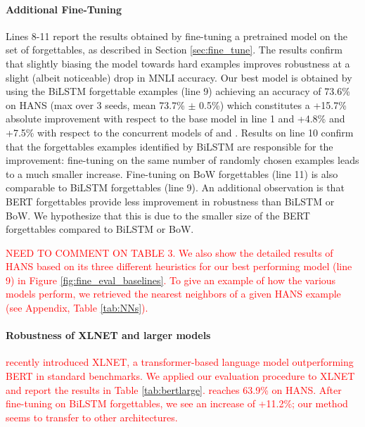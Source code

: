 \paragraph{Additional Fine-Tuning} Lines 8-11 report the results obtained by fine-tuning a pretrained model on the set of forgettables, as described in Section \ref{sec:fine_tune}. The results confirm that slightly biasing the model towards hard examples improves robustness at a slight (albeit noticeable) drop in MNLI accuracy. 
Our best model is obtained by using the BiLSTM forgettable examples (line 9) achieving an accuracy of 73.6\% on HANS (max over 3 seeds, mean 73.7\% $\pm$ 0.5\%)
which constitutes a +15.7\% absolute improvement with respect to the base model in line 1 and +4.8\% and +7.5\% with respect to the concurrent models of  and . 
Results on line 10 confirm that the forgettables examples identified by BiLSTM are responsible for the improvement: fine-tuning on the same number of randomly chosen examples leads to a much smaller increase. 
Fine-tuning on BoW forgettables (line 11) is also comparable to BiLSTM forgettables (line 9).
An additional observation is that BERT forgettables provide less improvement in robustness than BiLSTM or BoW. 
We hypothesize that this is due to the smaller size of the BERT forgettables compared to BiLSTM or BoW.

\textcolor{red}{NEED TO COMMENT ON TABLE 3. We also show the detailed results of HANS based on its three different heuristics for our best performing model (line 9) in Figure \ref{fig:fine_eval_baselines}. 
To give an example of how the various models perform, we retrieved the nearest neighbors of a given HANS example (see Appendix, Table \ref{tab:NNs}).}



\paragraph{Robustness of XLNET and larger models}
\textcolor{red}{\citet{yang2019xlnet} recently introduced XLNET, a transformer-based language model outperforming BERT in standard benchmarks. We applied our evaluation procedure to XLNET and report the results in Table \ref{tab:bertlarge}. \xlnetbase reaches 63.9\% on HANS. After fine-tuning on BiLSTM forgettables, we see an increase of +11.2\%; our method seems to transfer to other architectures.}

